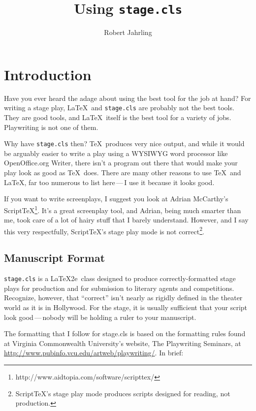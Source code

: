 \documentclass{report}
\begin{document}
\title{Using \texttt{stage.cls}}
\author{Robert Jahrling}
\maketitle

\chapter{Introduction}

Have you ever heard the adage about using the best tool for the job at hand? For writing a stage play, \LaTeX\ and \texttt{stage.cls} are probably not the best tools. They are good tools, and \LaTeX\ itself is the best tool for a variety of jobs. Playwriting is not one of them.

Why have \texttt{stage.cls} then? \TeX\ produces very nice output, and while it would be arguably easier to write a play using a WYSIWYG word processor like OpenOffice.org Writer, there isn’t a program out there that would make your play look as good as \TeX\ does. There are many other reasons to use \TeX\ and \LaTeX, far too numerous to list here\,—\,I use it because it looks good.

If you want to write screenplays, I suggest you look at Adrian McCarthy’s Script\TeX\footnote{http://www.aidtopia.com/software/scripttex/}. It’s a great screenplay tool, and Adrian, being much smarter than me, took care of a lot of hairy stuff that I barely understand. However, and I say this very respectfully, Script\TeX’s stage play mode is not correct\footnote{Script\TeX’s stage play mode produces scripts designed for reading, not production.}.

\section{Manuscript Format}

\texttt{stage.cls} is a \LaTeX2e\ class designed to produce correctly-formatted stage plays for production and for submission to literary agents and competitions. Recognize, however, that “correct” isn’t nearly as rigidly defined in the theater world as it is in Hollywood. For the stage, it is usually sufficient that your script look good\,—\,nobody will be holding a ruler to your manuscript.

The formatting that I follow for stage.cls is based on the formatting rules found at Virginia Commonwealth University’s website, The Playwriting Seminars, at \url{http://www.pubinfo.vcu.edu/artweb/playwriting/}. In brief:
\end{document}
